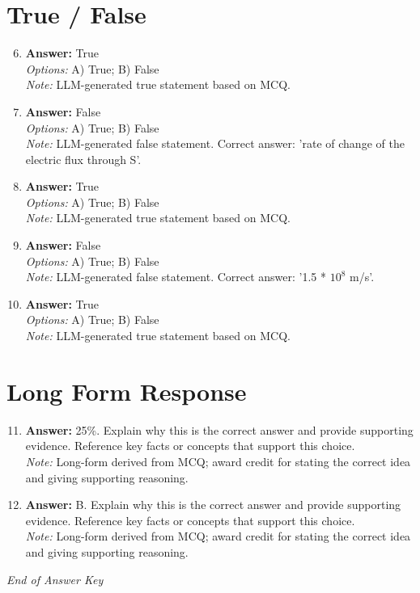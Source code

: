 \documentclass[12pt]{article}
\begin{document}
\section*{True / False}
\begin{enumerate}[label=\arabic*.]
\setcounter{enumi}{5}
\item \textbf{Answer:} True
\\ \textit{Options:} A) True; B) False
\\ \textit{Note:} LLM-generated true statement based on MCQ.
\item \textbf{Answer:} False
\\ \textit{Options:} A) True; B) False
\\ \textit{Note:} LLM-generated false statement. Correct answer: 'rate of change of the electric flux through S'.
\item \textbf{Answer:} True
\\ \textit{Options:} A) True; B) False
\\ \textit{Note:} LLM-generated true statement based on MCQ.
\item \textbf{Answer:} False
\\ \textit{Options:} A) True; B) False
\\ \textit{Note:} LLM-generated false statement. Correct answer: '1.5 * $10^8$ m/s'.
\item \textbf{Answer:} True
\\ \textit{Options:} A) True; B) False
\\ \textit{Note:} LLM-generated true statement based on MCQ.
\end{enumerate}

\section*{Long Form Response}
\begin{enumerate}[label=\arabic*.]
\setcounter{enumi}{10}
\item \textbf{Answer:} 25\%. Explain why this is the correct answer and provide supporting evidence. Reference key facts or concepts that support this choice.
\\ \textit{Note:} Long-form derived from MCQ; award credit for stating the correct idea and giving supporting reasoning.
\item \textbf{Answer:} B. Explain why this is the correct answer and provide supporting evidence. Reference key facts or concepts that support this choice.
\\ \textit{Note:} Long-form derived from MCQ; award credit for stating the correct idea and giving supporting reasoning.
\end{enumerate}

\vfill
\noindent\textit{End of Answer Key}
\end{document}
